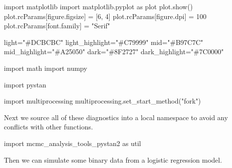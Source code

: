 \documentclass[
  letterpaper,
  DIV=11,
  numbers=noendperiod]{scrartcl}
\newenvironment{Shaded}{\begin{snugshade}}{\end{snugshade}}
\newcommand{\DecValTok}[1]{\textcolor[rgb]{0.68,0.00,0.00}{#1}}
\newcommand{\ImportTok}[1]{\textcolor[rgb]{0.00,0.46,0.62}{#1}}
\newcommand{\NormalTok}[1]{\textcolor[rgb]{0.00,0.23,0.31}{#1}}
\newcommand{\OperatorTok}[1]{\textcolor[rgb]{0.37,0.37,0.37}{#1}}
\newcommand{\StringTok}[1]{\textcolor[rgb]{0.13,0.47,0.30}{#1}}
\begin{document}
\begin{Shaded}
\begin{Highlighting}[]
\ImportTok{import}\NormalTok{ matplotlib}
\ImportTok{import}\NormalTok{ matplotlib.pyplot }\ImportTok{as}\NormalTok{ plot}
\NormalTok{plot.show()}
\NormalTok{plot.rcParams[}\StringTok{\textquotesingle{}figure.figsize\textquotesingle{}}\NormalTok{] }\OperatorTok{=}\NormalTok{ [}\DecValTok{6}\NormalTok{, }\DecValTok{4}\NormalTok{]}
\NormalTok{plot.rcParams[}\StringTok{\textquotesingle{}figure.dpi\textquotesingle{}}\NormalTok{] }\OperatorTok{=} \DecValTok{100}
\NormalTok{plot.rcParams[}\StringTok{\textquotesingle{}font.family\textquotesingle{}}\NormalTok{] }\OperatorTok{=} \StringTok{"Serif"}

\NormalTok{light}\OperatorTok{=}\StringTok{"\#DCBCBC"}
\NormalTok{light\_highlight}\OperatorTok{=}\StringTok{"\#C79999"}
\NormalTok{mid}\OperatorTok{=}\StringTok{"\#B97C7C"}
\NormalTok{mid\_highlight}\OperatorTok{=}\StringTok{"\#A25050"}
\NormalTok{dark}\OperatorTok{=}\StringTok{"\#8F2727"}
\NormalTok{dark\_highlight}\OperatorTok{=}\StringTok{"\#7C0000"}

\ImportTok{import}\NormalTok{ math}
\ImportTok{import}\NormalTok{ numpy}

\ImportTok{import}\NormalTok{ pystan}

\ImportTok{import}\NormalTok{ multiprocessing}
\NormalTok{multiprocessing.set\_start\_method(}\StringTok{"fork"}\NormalTok{)}
\end{Highlighting}
\end{Shaded}

Next we source all of these diagnostics into a local namespace to avoid
any conflicts with other functions.

\begin{Shaded}
\begin{Highlighting}[]
\ImportTok{import}\NormalTok{ mcmc\_analysis\_tools\_pystan2 }\ImportTok{as}\NormalTok{ util}
\end{Highlighting}
\end{Shaded}

Then we can simulate some binary data from a logistic regression model.
\end{document}
